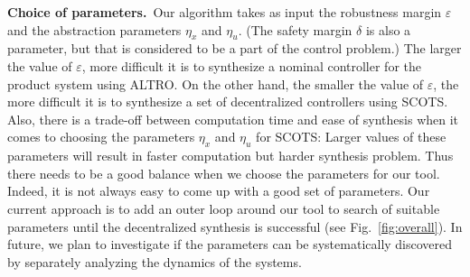 \smallskip
\noindent\textbf{Choice of parameters.}\
Our algorithm takes as input the robustness margin $\varepsilon$ and the abstraction parameters $\eta_x$ and $\eta_u$.
(The safety margin $\delta$ is also a parameter, but that is considered to be a part of the control problem.)
The larger the value of $\varepsilon$, more difficult it is to synthesize a nominal controller for the product system using ALTRO.
On the other hand, the smaller the value of $\varepsilon$, the more difficult it is to synthesize a set of decentralized controllers using SCOTS.
Also, there is a trade-off between computation time and ease of synthesis when it comes to choosing the parameters $\eta_x$ and $\eta_u$ for SCOTS: Larger values of these parameters will result in faster computation but harder synthesis problem.
Thus there needs to be a good balance when we choose the parameters for our tool.
Indeed, it is not always easy to come up with a good set of parameters.
Our current approach is to add an outer loop around our tool to search of suitable parameters until the decentralized synthesis is successful (see Fig.~\ref{fig:overall}).
In future, we plan to investigate if the parameters can be systematically discovered by separately analyzing the dynamics of the systems.



